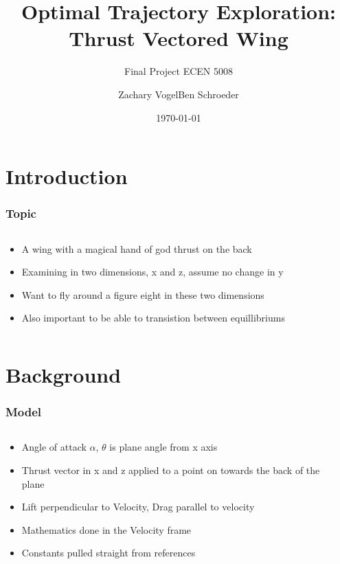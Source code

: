 \documentclass{beamer}
\title{Optimal Trajectory Exploration: Thrust Vectored Wing}
\subtitle{Final Project ECEN 5008}
\author{Zachary Vogel\quad Ben Schroeder}%
\date{\today}
\begin{document}
    
    \setcounter{showProgressBar}{0}
    \setcounter{showSlideNumbers}{0}
    
    
    \frame{\titlepage}
    
    \setcounter{framenumber}{0}
    \setcounter{showProgressBar}{1}
    \setcounter{showSlideNumbers}{1}
    
    \section{Introduction}
    \begin{frame}
        \frametitle{Topic}
        \begin{columns}[c]
            \begin{column}{0.6\textwidth}
                \begin{itemize}
                    \item A wing with a magical hand of god thrust on the back
                    \item Examining in two dimensions, x and z, assume no change in y
                    \item Want to fly around a figure eight in these two dimensions
                    \item Also important to be able to transistion between equillibriums
                \end{itemize}
            \end{column}
            \begin{column}{0.4\textwidth}
            \end{column}
        \end{columns}
    \end{frame}
    
    \section{Background}
    \begin{frame}
        \frametitle{Model}
        \begin{columns}[c]
            \begin{column}{0.6\textwidth}
                \begin{itemize}
                    \item Angle of attack $\alpha$, $\theta$ is plane angle from x axis
                    \item Thrust vector in x and z applied to a point on towards the back of the plane
                    \item Lift perpendicular to Velocity, Drag parallel to velocity
                    \item Mathematics done in the Velocity frame
                    \item Constants pulled straight from references
                \end{itemize}
            \end{column}
            \begin{column}{0.4\textwidth}
            \end{column}
        \end{columns}
    \end{frame}
\end{document}
